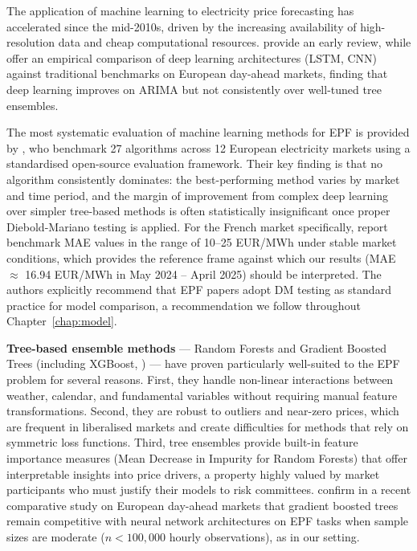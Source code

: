 The application of machine learning to electricity price forecasting has
accelerated since the mid-2010s, driven by the increasing availability of
high-resolution data and cheap computational resources. \citet{aggarwal2009}
provide an early review, while \citet{lago2018} offer an empirical comparison
of deep learning architectures (LSTM, CNN) against traditional benchmarks on
European day-ahead markets, finding that deep learning improves on ARIMA but
not consistently over well-tuned tree ensembles.

The most systematic evaluation of machine learning methods for EPF is provided
by \citet{lago2021}, who benchmark 27 algorithms across 12 European electricity
markets using a standardised open-source evaluation framework. Their key
finding is that no algorithm consistently dominates: the best-performing method
varies by market and time period, and the margin of improvement from complex
deep learning over simpler tree-based methods is often statistically
insignificant once proper Diebold-Mariano testing is applied. For the French
market specifically, \citet{lago2021} report benchmark MAE values in the range
of 10--25 EUR/MWh under stable market conditions, which provides the reference
frame against which our results (MAE $\approx$ 16.94 EUR/MWh in May 2024 --
April 2025) should be interpreted. The authors explicitly recommend that EPF
papers adopt DM testing as standard practice for model comparison, a
recommendation we follow throughout Chapter~\ref{chap:model}.

\textbf{Tree-based ensemble methods} — Random Forests \citep{breiman2001} and
Gradient Boosted Trees (including XGBoost, \citealt{chen2016}) — have proven
particularly well-suited to the EPF problem for several reasons. First, they
handle non-linear interactions between weather, calendar, and fundamental
variables without requiring manual feature transformations. Second, they are
robust to outliers and near-zero prices, which are frequent in liberalised
markets and create difficulties for methods that rely on symmetric loss
functions. Third, tree ensembles provide built-in feature importance measures
(Mean Decrease in Impurity for Random Forests) that offer interpretable
insights into price drivers, a property highly valued by market participants
who must justify their models to risk committees. \citet{tschora2022} confirm in a
recent comparative study on European day-ahead markets that gradient boosted trees
remain competitive with neural network architectures on EPF tasks when sample sizes
are moderate ($n < 100{,}000$ hourly observations), as in our setting.

